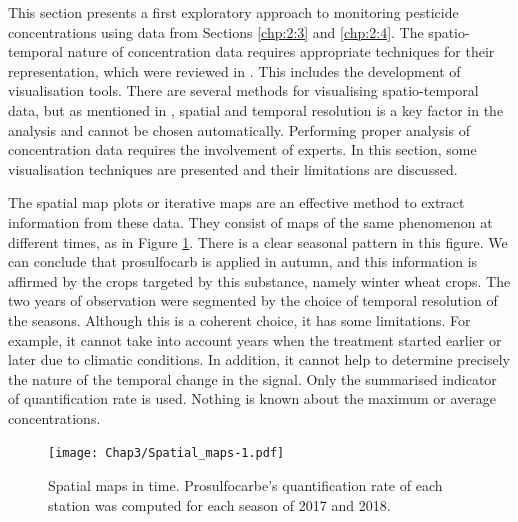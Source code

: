 This section presents a first exploratory approach to monitoring pesticide concentrations using data from Sections \ref{chp:2:3} and \ref{chp:2:4}. The spatio-temporal nature of concentration data requires appropriate techniques for their representation, which were reviewed in \cite{Andrienko2003,cressie2015,Maimon2010}. This includes the development of visualisation tools. There are several methods for visualising spatio-temporal data, but as mentioned in \cite{Ansari2019}, spatial and temporal resolution is a key factor in the analysis and cannot be chosen automatically. Performing proper analysis of concentration data requires the involvement of experts. In this section, some visualisation techniques are presented and their limitations are discussed. 

The spatial map plots or iterative maps \citep{Andrienko2003} are an effective method to extract information from these data. They consist of maps of the same phenomenon at different times, as in Figure \ref{fig:spa_ex}. There is a clear seasonal pattern in this figure. We can conclude that prosulfocarb is applied in autumn, and this information is affirmed by the crops targeted by this substance, namely winter wheat crops. The two years of observation were segmented by the choice of temporal resolution of the seasons. Although this is a coherent choice, it has some limitations. For example, it cannot take into account years when the treatment started earlier or later due to climatic conditions. In addition, it cannot help to determine precisely the nature of the temporal change in the signal. Only the summarised indicator of quantification rate is used. Nothing is known about the maximum or average concentrations.
 
\begin{figure}[ht]
    \centering
    \texttt{[image: Chap3/Spatial\_maps-1.pdf]}
    \caption{Spatial maps in time. Prosulfocarbe's quantification rate of each station was computed for each season of 2017 and 2018.}
    \label{fig:spa_ex}
\end{figure}

